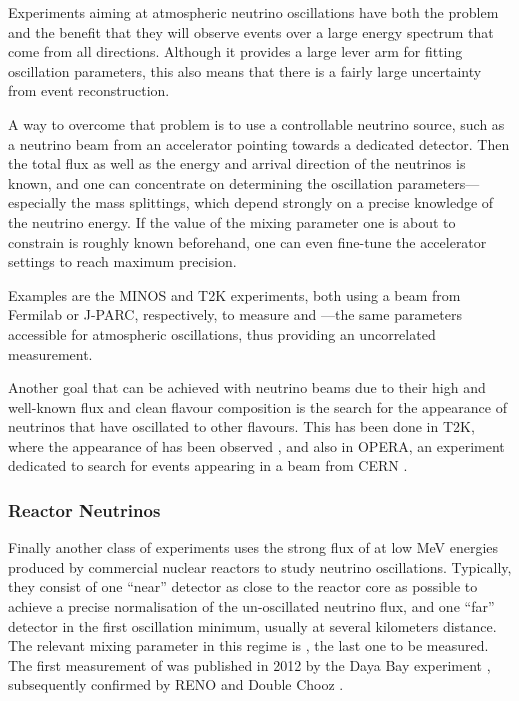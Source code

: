Experiments aiming at atmospheric neutrino oscillations have both the problem
and the benefit that they will observe events over a large energy spectrum that
come from all directions. Although it provides a large lever arm for fitting
oscillation parameters, this also means that there is a fairly large uncertainty
from event reconstruction.

A way to overcome that problem is to use a controllable neutrino source, such as
a neutrino beam from an accelerator pointing towards a dedicated detector. Then
the total flux as well as the energy and arrival direction of the neutrinos is
known, and one can concentrate on determining the oscillation
parameters---especially the mass splittings, which depend strongly on a precise
knowledge of the neutrino energy. If the value of the mixing parameter one is
about to constrain is roughly known beforehand, one can even fine-tune the
accelerator settings to reach maximum precision.

Examples are the MINOS \cite{MINOSparams} and T2K \cite{T2Kparams} experiments,
both using a \numu beam from Fermilab or J-PARC, respectively, to measure
 and ---the same parameters accessible for atmospheric
oscillations, thus providing an uncorrelated measurement.

Another goal that can be achieved with neutrino beams due to their high and
well-known flux and clean flavour composition is the search for the appearance
of neutrinos that have oscillated to other flavours. This has been done in T2K,
where the appearance of \nue has been observed \cite{T2Kapp}, and also in
OPERA, an experiment dedicated to search for \nutau events appearing in a \numu
beam from CERN \cite{OPERAapp}.

\subsubsection{Reactor Neutrinos}

Finally another class of experiments uses the strong flux of \nuebar at low MeV
energies produced by commercial nuclear reactors to study neutrino
oscillations. Typically, they consist of one ``near'' detector as close to the
reactor core as possible to achieve a precise normalisation of the
un-oscillated neutrino flux, and one ``far'' detector in the first oscillation
minimum, usually at several kilometers distance.
The relevant mixing parameter in this regime is , the last one to be
measured. The first measurement of  was published in 2012 by the Daya
Bay experiment \cite{DayaBay}, subsequently confirmed by RENO and Double Chooz
\cite{RENO, DoubleChooz}.

